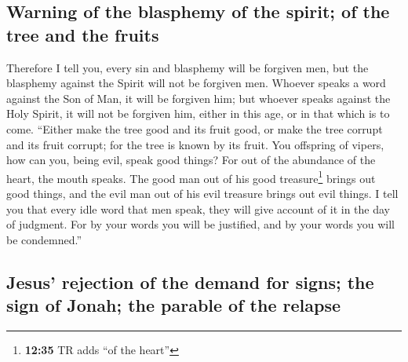\hypertarget{warning-of-the-blasphemy-of-the-spirit-of-the-tree-and-the-fruits}{%
\subsection{Warning of the blasphemy of the spirit; of the tree and the
fruits}\label{warning-of-the-blasphemy-of-the-spirit-of-the-tree-and-the-fruits}}

 Therefore I tell you, every sin and blasphemy will be
forgiven men, but the blasphemy against the Spirit will not be forgiven
men.  Whoever speaks a word against the Son of Man, it
will be forgiven him; but whoever speaks against the Holy Spirit, it
will not be forgiven him, either in this age, or in that which is to
come.  ``Either make the tree good and its fruit good, or
make the tree corrupt and its fruit corrupt; for the tree is known by
its fruit.  You offspring of vipers, how can you, being
evil, speak good things? For out of the abundance of the heart, the
mouth speaks.  The good man out of his good
treasure\footnote{\textbf{12:35} TR adds ``of the heart''} brings out
good things, and the evil man out of his evil treasure brings out evil
things.  I tell you that every idle word that men speak,
they will give account of it in the day of judgment.  For
by your words you will be justified, and by your words you will be
condemned.''

\hypertarget{jesus-rejection-of-the-demand-for-signs-the-sign-of-jonah-the-parable-of-the-relapse}{%
\subsection{Jesus' rejection of the demand for signs; the sign of Jonah;
the parable of the
relapse}\label{jesus-rejection-of-the-demand-for-signs-the-sign-of-jonah-the-parable-of-the-relapse}}

